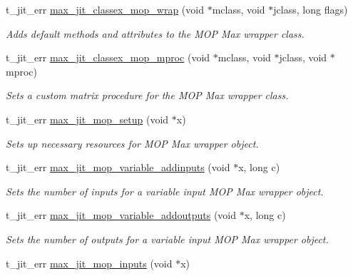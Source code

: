 \begin{DoxyCompactItemize}
\item 
t\_\-jit\_\-err \hyperlink{group__maxmopmod_ga7e08584771f58ce1fe0b190d27b5759b}{max\_\-jit\_\-classex\_\-mop\_\-wrap} (void $\ast$mclass, void $\ast$jclass, long flags)
\begin{DoxyCompactList}\small\item\em Adds default methods and attributes to the MOP Max wrapper class. \item\end{DoxyCompactList}\item 
t\_\-jit\_\-err \hyperlink{group__maxmopmod_ga2641dd1bad637ebd190b858d2d72e928}{max\_\-jit\_\-classex\_\-mop\_\-mproc} (void $\ast$mclass, void $\ast$jclass, void $\ast$mproc)
\begin{DoxyCompactList}\small\item\em Sets a custom matrix procedure for the MOP Max wrapper class. \item\end{DoxyCompactList}\item 
t\_\-jit\_\-err \hyperlink{group__maxmopmod_ga21f81f6d30f54a671a78a6b44986392a}{max\_\-jit\_\-mop\_\-setup} (void $\ast$x)
\begin{DoxyCompactList}\small\item\em Sets up necessary resources for MOP Max wrapper object. \item\end{DoxyCompactList}\item 
t\_\-jit\_\-err \hyperlink{group__maxmopmod_ga3e12ca35fc39ddd1209156912708f03c}{max\_\-jit\_\-mop\_\-variable\_\-addinputs} (void $\ast$x, long c)
\begin{DoxyCompactList}\small\item\em Sets the number of inputs for a variable input MOP Max wrapper object. \item\end{DoxyCompactList}\item 
t\_\-jit\_\-err \hyperlink{group__maxmopmod_ga7dab1b1ecbcea42dcdb18fc929385fa9}{max\_\-jit\_\-mop\_\-variable\_\-addoutputs} (void $\ast$x, long c)
\begin{DoxyCompactList}\small\item\em Sets the number of outputs for a variable input MOP Max wrapper object. \item\end{DoxyCompactList}\item 
t\_\-jit\_\-err \hyperlink{group__maxmopmod_gaec99be7b60c1cec6a8391097d5008bc6}{max\_\-jit\_\-mop\_\-inputs} (void $\ast$x)

\end{DoxyCompactItemize}
